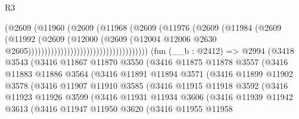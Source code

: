 \begin{lexlean}{R3}
\begin{coremodule}
                                                  (@2609
                                                    (@11960
                                                      (@2609
                                                        (@11968
                                                          (@2609
                                                            (@11976
                                                              (@2609
                                                                (@11984
                                                                  (@2609
                                                                    (@11992
                                                                      (@2609
                                                                        (@12000
                                                                          (@2609
                                                                            (@12004
                                                                              @12006
                                                                              @2630
                                                                              @2605)))))))))))))))))))))))))))))))))))))
    (fun (__b : @2412) =>
    @2994
      (@3418
        @3543
        (@3416
          @11867
          @11870
          @3550
          (@3416
            @11875
            @11878
            @3557
            (@3416
              @11883
              @11886
              @3564
              (@3416
                @11891
                @11894
                @3571
                (@3416
                  @11899
                  @11902
                  @3578
                  (@3416
                    @11907
                    @11910
                    @3585
                    (@3416
                      @11915
                      @11918
                      @3592
                      (@3416
                        @11923
                        @11926
                        @3599
                        (@3416
                          @11931
                          @11934
                          @3606
                          (@3416
                            @11939
                            @11942
                            @3613
                            (@3416
                              @11947
                              @11950
                              @3620
                              (@3416
                                @11955
                                @11958

\end{coremodule}
\end{lexlean}
